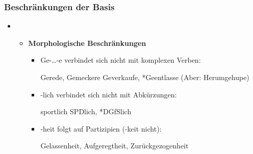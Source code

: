 \begin{frame}
\frametitle{Beschränkungen der Basis}

\begin{itemize}
	\item[]

	\begin{itemize}
		\item \textbf{Morphologische Beschränkungen}
	
		\begin{itemize}
			\item Ge-{\dots}-e verbindet sich nicht mit komplexen Verben:
		
			\ea Gerede, Gemeckere \vs *Geverkaufe, *Geentlasse (Aber: Herumgehupe)
			\z
			
			\item -lich verbindet sich nicht mit Abkürzungen:
		
			\ea sportlich \vs *SPDlich, *DGfSlich
			\z
			
			\item -heit folgt auf Partizipien (-keit nicht):
		 
			\ea Gelassenheit, Aufgeregtheit, Zurückgezogenheit
		 	\z
		 	
		\end{itemize}
	
	\end{itemize}

\end{itemize}

\end{frame}



